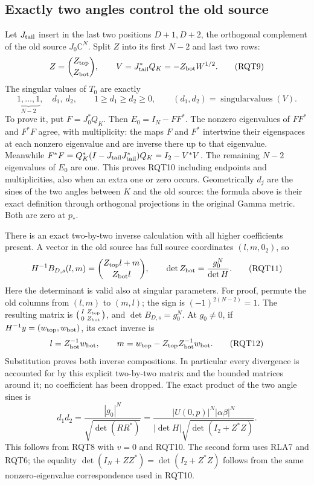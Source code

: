\documentclass[11pt]{article}
\begin{document}
\subsection{Exactly two angles control the old source}
Let $J_{\rm tail}$ insert in the last two positions $D+1,D+2$,
the orthogonal complement of the old source $J_0\mathbb C^N$.
Split $Z$ into its first $N-2$ and last two rows:
\[
 Z=\binom{Z_{\rm top}}{Z_{\rm bot}},\qquad
 V=J_{\rm tail}^*Q_K=-Z_{\rm bot}W^{1/2}.
 \tag{RQT9}
\]
The singular values of $T_0$ are exactly
\[
 \underbrace{1,\ldots,1}_{N-2},\quad d_1,\ d_2,
 \qquad 1\ge d_1\ge d_2\ge0,
 \qquad (d_1,d_2)=\operatorname{singularvalues}(V).
 \tag{RQT10}
\]
To prove it, put $F=J_0^*Q_K$.  Then $E_0=I_N-FF^*$.
The nonzero eigenvalues of $FF^*$ and $F^*F$ agree, with
multiplicity: the maps $F$ and $F^*$ intertwine their eigenspaces
at each nonzero eigenvalue and are inverse there up to that
eigenvalue.  Meanwhile
$F^*F=Q_K^*(I-J_{\rm tail}J_{\rm tail}^*)Q_K=I_2-V^*V$.
The remaining $N-2$ eigenvalues of $E_0$ are one.  This proves
RQT10 including endpoints and multiplicities, also when an extra
one or zero occurs.  Geometrically $d_j$ are the sines of the
two angles between $K$ and the old source: the formula above is
their exact definition through orthogonal projections in the
original Gamma metric.  Both are zero at $p_*$.

There is an exact two-by-two inverse calculation with all higher
coefficients present.  A vector in the old source has full source
coordinates $(l,m,0_2)$, so
\[
 H^{-1}B_{D,s}(l,m)=\binom{Z_{\rm top}l+m}{Z_{\rm bot}l},\qquad
 \det Z_{\rm bot}=\frac{g_0^N}{\det H}.
 \tag{RQT11}
\]
Here the determinant is valid also at singular parameters.
For proof, permute the old columns from $(l,m)$ to $(m,l)$;
the sign is $(-1)^{2(N-2)}=1$.  The resulting matrix is
$\bigl(\begin{smallmatrix}I&Z_{\rm top}\\0&Z_{\rm bot}\end{smallmatrix}\bigr)$,
and $\det B_{D,s}=g_0^N$.  At $g_0\ne0$, if
$H^{-1}y=(w_{\rm top},w_{\rm bot})$, its exact inverse is
\[
 l=Z_{\rm bot}^{-1}w_{\rm bot},\qquad
 m=w_{\rm top}-Z_{\rm top}Z_{\rm bot}^{-1}w_{\rm bot}.
 \tag{RQT12}
\]
Substitution proves both inverse compositions.  In particular
every divergence is accounted for by this explicit two-by-two
matrix and the bounded matrices around it; no coefficient has
been dropped.  The exact product of the two angle sines is
\[
 d_1d_2=\frac{|g_0|^N}{\sqrt{\det(RR^*)}}
 =\frac{|U(0,p)|^N|\alpha\beta|^N}
 {|\det H|\sqrt{\det(I_2+Z^*Z)}}.
 \tag{RQT13}
\]
This follows from RQT8 with $v=0$ and RQT10.  The second form
uses RLA7 and RQT6; the equality
$\det(I_N+ZZ^*)=\det(I_2+Z^*Z)$ follows from the same
nonzero-eigenvalue correspondence used in RQT10.
\end{document}
